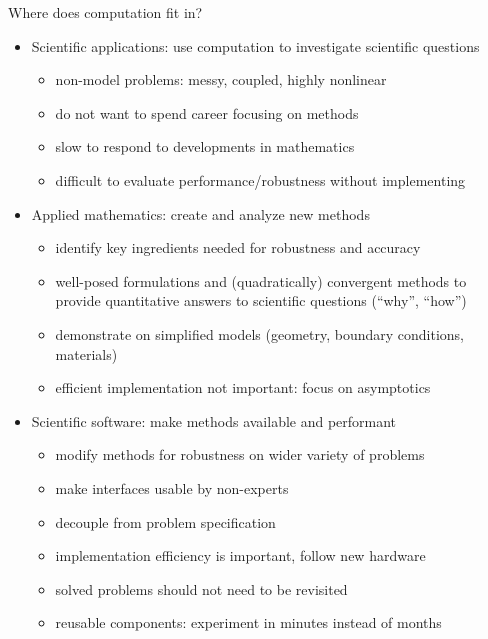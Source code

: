 \documentclass{beamer}
\begin{document}
\begin{frame}{Where does computation fit in?}
  \begin{itemize}
  \item Scientific applications: use computation to investigate scientific questions
    \begin{itemize}
    \item non-model problems: messy, coupled, highly nonlinear
    \item do not want to spend career focusing on methods
    \item slow to respond to developments in mathematics
    \item difficult to evaluate performance/robustness without implementing
    \end{itemize}
  \item Applied mathematics: create and analyze new methods
    \begin{itemize}
    \item identify key ingredients needed for robustness and accuracy
    \item well-posed formulations and (quadratically) convergent methods to provide quantitative answers to scientific questions (``why'', ``how'')
    \item demonstrate on simplified models (geometry, boundary conditions, materials)
    \item efficient implementation not important: focus on asymptotics
    \end{itemize}
  \item Scientific software: make methods available and performant
    \begin{itemize}
    \item modify methods for robustness on wider variety of problems
    \item make interfaces usable by non-experts
    \item decouple from problem specification
    \item implementation efficiency is important, follow new hardware
    \item solved problems should not need to be revisited
    \item reusable components: experiment in minutes instead of months
    \end{itemize}
  \end{itemize}
\end{frame}
\end{document}
